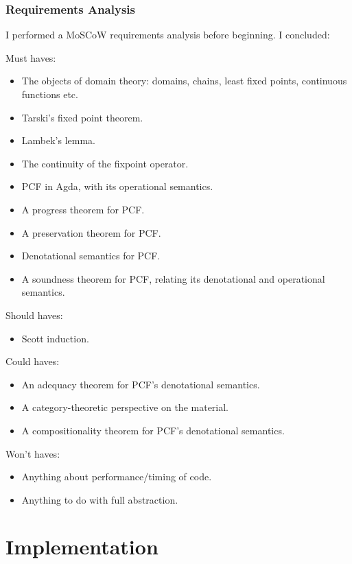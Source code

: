 \documentclass[12pt,a4paper,twoside,openright]{report}
\begin{document}
\subsection{Requirements Analysis}
I performed a MoSCoW requirements analysis before beginning. I concluded:

Must haves:
\begin{itemize}
\item The objects of domain theory: domains, chains, least fixed points, continuous functions etc.
\item Tarski's fixed point theorem.
\item Lambek's lemma.
\item The continuity of the fixpoint operator.
\item PCF in Agda, with its operational semantics.
\item A progress theorem for PCF.
\item A preservation theorem for PCF.
\item Denotational semantics for PCF.
\item A soundness theorem for PCF, relating its denotational and operational semantics.
\end{itemize}
Should haves:
\begin{itemize}
\item Scott induction.
\end{itemize}
Could haves:
\begin{itemize}
\item An adequacy theorem for PCF's denotational semantics.
\item A category-theoretic perspective on the material.
\item A compositionality theorem for PCF's denotational semantics.
\end{itemize}
Won't haves:
\begin{itemize}
\item Anything about performance/timing of code.
\item Anything to do with full abstraction.
\end{itemize}
\chapter{Implementation}
\end{document}
